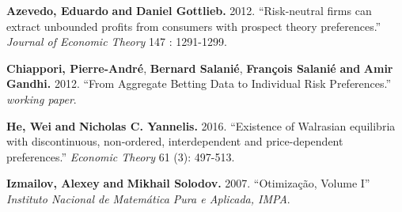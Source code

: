 \documentclass[pdftex]{article}
\numberwithin{equation}{section}
\theoremstyle{th}
\newtheorem{proof lemma}{{Proof Lemma}.}
\theoremstyle{definition}
\begin{document}
{\begin{thebibliography}{}
\textbf{Azevedo, Eduardo} \textbf{and} \textbf{Daniel Gottlieb.} 2012. ``{Risk-neutral firms can extract unbounded profits from consumers with prospect theory preferences.}'' \emph{Journal of Economic Theory} 147 : 1291-1299.




\textbf{Chiappori, Pierre-Andr\'{e}}, \textbf{Bernard Salani\'{e}}, \textbf{Fran\c{c}ois Salani\'{e}} \textbf{and} \textbf{Amir Gandhi.} 2012. ``{From Aggregate Betting Data
to Individual Risk Preferences.}'' \emph{working paper}.


\textbf{He, Wei} \textbf{and} \textbf{Nicholas C. Yannelis.} 2016. ``{Existence of Walrasian equilibria with discontinuous, non-ordered, interdependent and price-dependent preferences.}'' \emph{Economic Theory} 61 ({3}): 497-513.








\textbf{Izmailov, Alexey} \textbf{and} \textbf{Mikhail Solodov.} 2007. ``{Otimiza\c{c}\~{a}o, Volume I}'' \emph{Instituto Nacional de Matem\'{a}tica Pura e Aplicada, IMPA}.



\end{thebibliography}}
\end{document}
